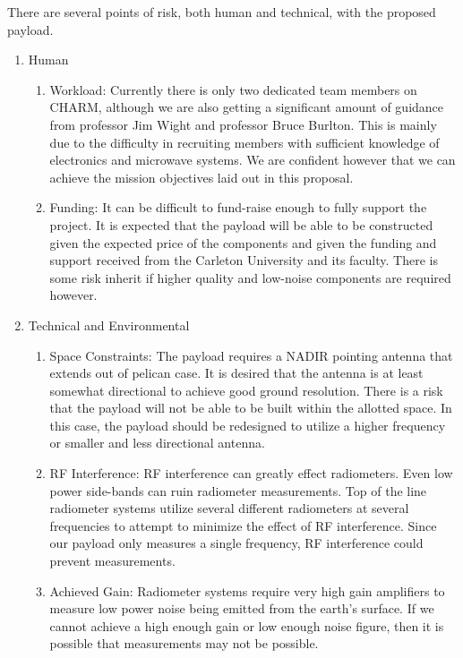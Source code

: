 \documentclass[12pt]{article}
\begin{document}
There are several points of risk, both human and technical, with the proposed payload. 

\begin{enumerate}
\item Human
\begin{enumerate}

\item Workload: Currently there is only two dedicated team members on CHARM, although we are also getting a significant amount of guidance from professor Jim Wight and professor Bruce Burlton. This is mainly due to the difficulty in recruiting members with sufficient knowledge of electronics and microwave systems. We are confident however that we can achieve the mission objectives laid out in this proposal.

\item Funding: It can be difficult to fund-raise enough to fully support the project. It is expected that the payload will be able to be constructed given the expected price of the components and given the funding and support received from the Carleton University and its faculty. There is some risk inherit if higher quality and low-noise components are required however.

\end{enumerate}

\item Technical and Environmental
\begin{enumerate}

\item Space Constraints: The payload requires a NADIR pointing antenna that extends out of pelican case. It is desired that the antenna is at least somewhat directional to achieve good ground resolution. There is a risk that the payload will not be able to be built within the allotted space. In this case, the payload should be redesigned to utilize a higher frequency or smaller and less directional antenna.

\item RF Interference: RF interference can greatly effect radiometers. Even low power side-bands can ruin radiometer measurements. Top of the line radiometer systems utilize several different radiometers at several frequencies to attempt to minimize the effect of RF interference. Since our payload only measures a single frequency, RF interference could prevent measurements.

\item Achieved Gain: Radiometer systems require very high gain amplifiers to measure low power noise being emitted from the earth's surface. If we cannot achieve a high enough gain or low enough noise figure, then it is possible that measurements may not be possible.


\end{enumerate}
\end{enumerate}
\end{document}
